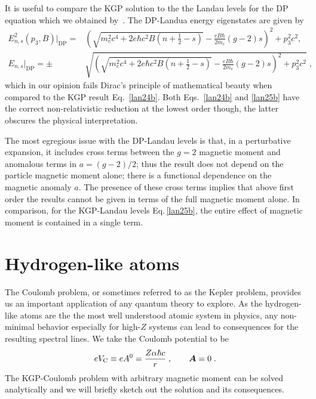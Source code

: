 It is useful to compare the KGP solution to the the Landau levels for the DP equation which we obtained by~\cite{Tsai:1971zma}. The DP-Landua energy eigenstates are given by
\begin{subequations}
\begin{alignat}{1}
\label{lan25} 
E^{2}_{n,s}(p_{3},B)|_\mathrm{DP} =&\left(\!\!\sqrt{\displaystyle m_{e}^{2}c^{4}\!+\!2e\hbar c^{2}B\left(n+\frac{1}{2}-s\right)}-\frac{eB\hbar}{2m_{e}}(g-2)s\!\right)^{2}\!\!\!+p_{3}^{\!\!2}c^{2},\\[0.4cm]
\label{lan25b}
E_{n,s}|_\mathrm{DP} =\pm &\sqrt{\!\left(\!\!\sqrt{\displaystyle m_{e}^{2}c^{4}+2e\hbar c^{2}B\left(n+\frac{1}{2}-s\right)}\!-\!\frac{eB\hbar}{2m_{e}}(g-2)s\!\right)^{\!\!2}\!\!\!+p_{3}^{2}c^{2}}\;,
\end{alignat}
\end{subequations}
which in our opinion fails Dirac\rq s principle of mathematical beauty when compared to the KGP result Eq.~\eqref{lan24b}. Both Eqs.~\eqref{lan24b} and \eqref{lan25b} have the correct non-relativistic reduction at the lowest order though, the latter obscures the physical interpretation.

The most egregious issue with the DP-Landau levels is that, in a perturbative expansion, it includes cross terms between the $g\!=\!2$ magnetic moment and anomalous terms in $a=(g-2)/2$; thus the result does not depend on the particle magnetic moment alone; there is a functional dependence on the magnetic anomaly $a$. The presence of these cross terms implies that above first order the results cannot be given in terms of the full magnetic moment alone. In comparison, for the KGP-Landau levels Eq.\,\eqref{lan25b}, the entire effect of magnetic moment is contained in a single term.

\section{Hydrogen-like atoms}
\label{sec:coulomb}
The Coulomb problem, or sometimes referred to as the Kepler problem, provides us an important application of any quantum theory to explore. As the hydrogen-like atoms are the the most well understood atomic system in physics, any non-minimal behavior especially for high-$Z$ systems can lead to consequences for the resulting spectral lines. We take the Coulomb potential to be
\begin{equation}
	\label{eq:coulomb:01} eV_\mathrm{C}\equiv e A^{0}=\frac{Z \alpha\hbar c}{r}\;,\qquad \boldsymbol{A}=0\;.
\end{equation}
The KGP-Coulomb problem with arbitrary magnetic moment can be solved analytically and we will briefly sketch out the solution and its consequences.


